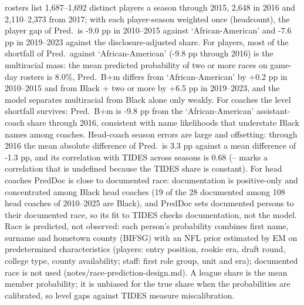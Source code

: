 \begin{table}[!h]
{\begin{threeparttable}
\begin{tablenotes}[para]
rosters list 1,687--1,692 distinct players a season through 2015, 2,648 in 2016 and 2,110--2,373 from 2017; with each player-season weighted once (headcount), the player gap of Pred.\ is -9.0 pp in 2010--2015 against `African-American' and -7.6 pp in 2019--2023 against the disclosure-adjusted share. For players, most of the shortfall of Pred.\ against `African-American' (-9.8 pp through 2016) is the multiracial mass: the mean predicted probability of two or more races on game-day rosters is 8.0\%, Pred.\ B+m differs from `African-American' by +0.2 pp in 2010--2015 and from Black + two or more by +6.5 pp in 2019--2023, and the model separates multiracial from Black alone only weakly. For coaches the level shortfall survives: Pred.\ B+m is -9.8 pp from the `African-American' assistant-coach share through 2016, consistent with name likelihoods that understate Black names among coaches. Head-coach season errors are large and offsetting: through 2016 the mean absolute difference of Pred.\ is 3.3 pp against a mean difference of -1.3 pp, and its correlation with TIDES across seasons is 0.68 (-- marks a correlation that is undefined because the TIDES share is constant). For head coaches PredDoc is close to documented race: documentation is positive-only and concentrated among Black head coaches (19 of the 28 documented among 108 head coaches of 2010--2025 are Black), and PredDoc sets documented persons to their documented race, so its fit to TIDES checks documentation, not the model. Race is predicted, not observed: each person's probability combines first name, surname and hometown county (BIFSG) with an NFL prior estimated by EM on predetermined characteristics (players: entry position, rookie era, draft round, college type, county availability; staff: first role group, unit and era); documented race is not used (notes/race-prediction-design.md). A league share is the mean member probability; it is unbiased for the true share when the probabilities are calibrated, so level gaps against TIDES measure miscalibration.
\end{tablenotes}
\end{threeparttable}}
\end{table}
